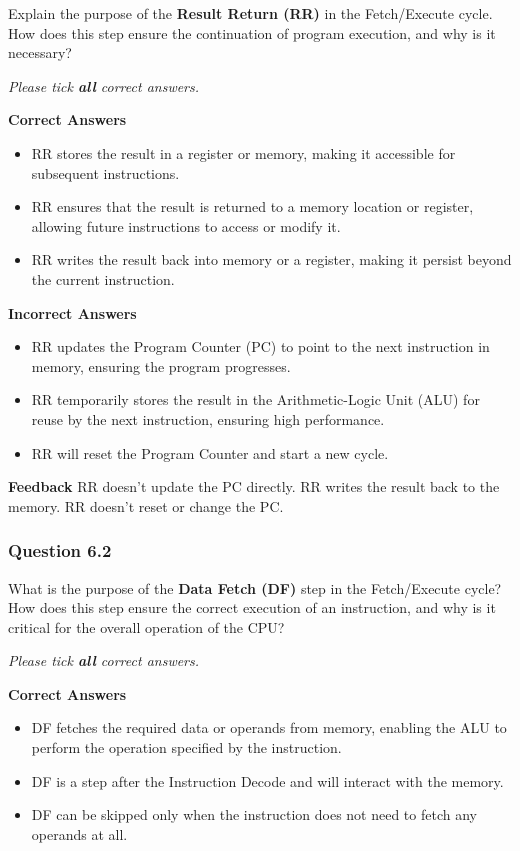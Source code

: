 Explain the purpose of the \textbf{Result Return (RR)} in the Fetch/Execute cycle. How does this step ensure the continuation of program execution, and why is it necessary?

\textit{Please tick \textbf{all} correct answers.}

\textbf{Correct Answers}
\begin{itemize}
    \item RR stores the result in a register or memory, making it accessible for subsequent instructions.
    \item RR ensures that the result is returned to a memory location or register, allowing future instructions to access or modify it.
    \item RR writes the result back into memory or a register, making it persist beyond the current instruction.
\end{itemize}

\textbf{Incorrect Answers}
\begin{itemize}
    \item RR updates the Program Counter (PC) to point to the next instruction in memory, ensuring the program progresses.
    \item RR temporarily stores the result in the Arithmetic-Logic Unit (ALU) for reuse by the next instruction, ensuring high performance.
    \item RR will reset the Program Counter and start a new cycle.
\end{itemize}

\textbf{Feedback}
RR doesn’t update the PC directly. RR writes the result back to the memory. RR doesn’t reset or change the PC.

\subsubsection{Question 6.2}

What is the purpose of the \textbf{Data Fetch (DF)} step in the Fetch/Execute cycle? How does this step ensure the correct execution of an instruction, and why is it critical for the overall operation of the CPU?

\textit{Please tick \textbf{all} correct answers.}

\textbf{Correct Answers}
\begin{itemize}
    \item DF fetches the required data or operands from memory, enabling the ALU to perform the operation specified by the instruction.
    \item DF is a step after the Instruction Decode and will interact with the memory.
    \item DF can be skipped only when the instruction does not need to fetch any operands at all.
\end{itemize}

